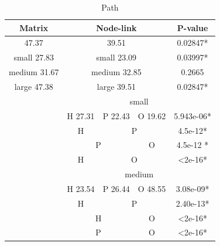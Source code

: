 \documentclass{l4proj}
\begin{document}
\begin{table}[]
\centering
\caption{Path}
\label{my-label}
\begin{tabular}{|c|c|c|c|c|c|c|}
\hline
\multicolumn{3}{|c|}{\textbf{Matrix}}     & \multicolumn{3}{c|}{\textbf{Node-link}} & \textbf{P-value} \\ \hline
\multicolumn{3}{|c|}{47.37}               & \multicolumn{3}{c|}{39.51}              & 0.02847*         \\ \hline
\multicolumn{3}{|c|}{small 27.83}         & \multicolumn{3}{c|}{small 23.09}        & 0.03997*         \\ \hline
\multicolumn{3}{|c|}{medium 31.67}        & \multicolumn{3}{c|}{medium 32.85}       & 0.2665           \\ \hline
\multicolumn{3}{|c|}{large 47.38}         & \multicolumn{3}{c|}{large 39.51}        & 0.02847*         \\ \hline
\multicolumn{3}{|c|}{\multirow{15}{*}{}}  & \multicolumn{4}{c|}{small}                                 \\ \cline{4-7} 
\multicolumn{3}{|c|}{}                    & H 27.31      & P 22.43     & O 19.62    & 5.943e-06*       \\ \cline{4-7} 
\multicolumn{3}{|c|}{}                    & H            & \multicolumn{2}{c|}{P}   & 4.5e-12*         \\ \cline{4-7} 
\multicolumn{3}{|c|}{}                    & \multicolumn{2}{c|}{P}     & O          & 4.5e-12 *        \\ \cline{4-7} 
\multicolumn{3}{|c|}{}                    & H            & \multicolumn{2}{c|}{O}   & \textless 2e-16* \\ \cline{4-7} 
\multicolumn{3}{|c|}{}                    & \multicolumn{4}{c|}{medium}                                \\ \cline{4-7} 
\multicolumn{3}{|c|}{}                    & H 23.54      & P 26.44     & O 48.55    & 3.08e-09*        \\ \cline{4-7} 
\multicolumn{3}{|c|}{}                    & H            & \multicolumn{2}{c|}{P}   & 2.40e-13*        \\ \cline{4-7} 
\multicolumn{3}{|c|}{}                    & \multicolumn{2}{c|}{H}     & O          & \textless 2e-16* \\ \cline{4-7} 
\multicolumn{3}{|c|}{}                    & \multicolumn{2}{c|}{P}     & O          & \textless 2e-16* \\ \cline{4-7} 

\end{tabular}
\end{table}
\end{document}
